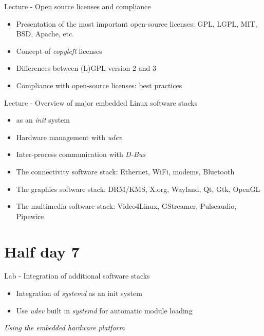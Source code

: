 \documentclass[a4paper,12pt,obeyspaces,spaces,hyphens]{article}
\begin{document}
\feagendaonecolumn
{Lecture - Open source licenses and compliance}
{
  \begin{itemize}
  \item Presentation of the most important open-source licenses: GPL,
    LGPL, MIT, BSD, Apache, etc.
  \item Concept of {\em copyleft} licenses
  \item Differences between (L)GPL version 2 and 3
  \item Compliance with open-source licenses: best practices
  \end{itemize}
}

\feagendaonecolumn
{Lecture - Overview of major embedded Linux software stacks}
{
  \begin{itemize}
  \item {} as an {\em init} system
  \item Hardware management with {\em udev}
  \item Inter-process communication with {\em D-Bus}
  \item The connectivity software stack: Ethernet, WiFi, modems,
    Bluetooth
  \item The graphics software stack: DRM/KMS, X.org, Wayland, Qt, Gtk,
    OpenGL
  \item The multimedia software stack: Video4Linux, GStreamer,
    Pulseaudio, Pipewire
  \end{itemize}
}

\section{Half day 7}

\feagendaonecolumn
{Lab - Integration of additional software stacks}
{
  \begin{itemize}
  \item Integration of {\em systemd} as an init system
  \item Use {\em udev} built in {\em systemd} for automatic module
    loading
  \end{itemize}

  \vspace{0.5cm}
  {\em Using the embedded hardware platform}
}
\end{document}
